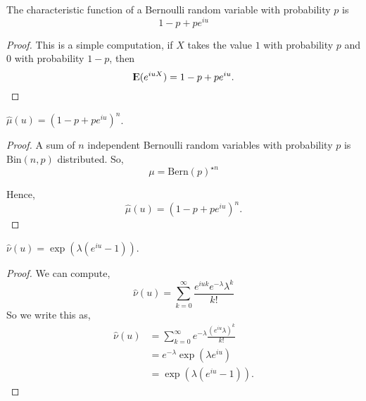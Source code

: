 \documentclass{unswmaths}
\begin{document}
\begin{lemma}
    The characteristic function of a Bernoulli random variable
    with probability $p$ is
    \begin{equation*}
        1-p+pe^{iu}
    \end{equation*}
\end{lemma}
\begin{proof}
    This is a simple computation, if $X$ takes the value $1$ with probability
    $p$ and $0$ with probability $1-p$, then
    \begin{equation*}
        {\rm I\kern-.3em E}(e^{iuX}) = 1-p+pe^{iu}.
    \end{equation*}
\end{proof}
\begin{lemma}
    $\hat{\mu}(u) = (1-p+pe^{iu})^n$.
\end{lemma}
\begin{proof}
    A sum of $n$ independent Bernoulli random variables with
    probability $p$ is $\mathrm{Bin}(n,p)$ distributed. So,
    \begin{equation*}
        {\mu} = {\mathrm{Bern}(p)}^{\star n}
    \end{equation*}
    
    Hence,
    \begin{equation*}
        \hat{\mu}(u) = (1-p+pe^{iu})^n.
    \end{equation*}
\end{proof}



\begin{lemma}
    $\hat{\nu}(u) = \exp(\lambda(e^{iu}-1))$.
\end{lemma}
\begin{proof}
    We can compute,
    \begin{equation*}
        \hat{\nu}(u) = \sum_{k=0}^\infty \frac{e^{iuk}e^{-\lambda}\lambda^k}{k!}
    \end{equation*}
    So we write this as,
    \begin{align*}
        \hat{\nu}(u) &= \sum_{k=0}^\infty e^{-\lambda} \frac{(e^{iu}\lambda)^k}{k!}\\
        &= e^{-\lambda} \exp(\lambda e^{iu})\\
        &= \exp(\lambda(e^{iu}-1)).
    \end{align*}
\end{proof}
\end{document}
